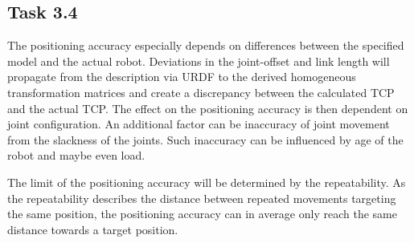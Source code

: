 \subsection*{Task 3.4}
The positioning accuracy especially depends on differences between the specified model and the actual robot. Deviations in the joint-offset and link length will propagate from the description via URDF to the derived homogeneous transformation matrices and create a discrepancy between the calculated TCP and the actual TCP. The effect on the positioning accuracy is then dependent on joint configuration. An additional factor can be inaccuracy of joint movement from the slackness of the joints. Such inaccuracy can be influenced by age of the robot and maybe even load.

The limit of the positioning accuracy will be determined by the repeatability. As the repeatability describes the distance between repeated movements targeting the same position, the positioning accuracy can in average only reach the same distance towards a target position.